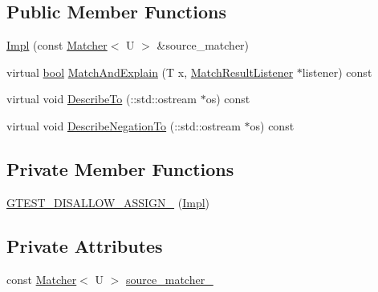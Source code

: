 \subsection*{Public Member Functions}
\begin{DoxyCompactItemize}
\item 
\hyperlink{classtesting_1_1internal_1_1MatcherCastImpl_3_01T_00_01Matcher_3_01U_01_4_01_4_1_1Impl_adcffa298fd17f1827311420b2075aaab}{Impl} (const \hyperlink{classtesting_1_1Matcher}{Matcher}$<$ U $>$ \&source\+\_\+matcher)
\item 
virtual \hyperlink{classbool}{bool} \hyperlink{classtesting_1_1internal_1_1MatcherCastImpl_3_01T_00_01Matcher_3_01U_01_4_01_4_1_1Impl_acc8cbc68475bb2cb7af971ad788142fc}{Match\+And\+Explain} (T x, \hyperlink{classtesting_1_1MatchResultListener}{Match\+Result\+Listener} $\ast$listener) const
\item 
virtual void \hyperlink{classtesting_1_1internal_1_1MatcherCastImpl_3_01T_00_01Matcher_3_01U_01_4_01_4_1_1Impl_a42677b4e3e3d7b9c8610e33c399f9154}{Describe\+To} (\+::std\+::ostream $\ast$os) const
\item 
virtual void \hyperlink{classtesting_1_1internal_1_1MatcherCastImpl_3_01T_00_01Matcher_3_01U_01_4_01_4_1_1Impl_a2d363b3748fd1f4fd98372d1f4bfce4e}{Describe\+Negation\+To} (\+::std\+::ostream $\ast$os) const
\end{DoxyCompactItemize}
\subsection*{Private Member Functions}
\begin{DoxyCompactItemize}
\item 
\hyperlink{classtesting_1_1internal_1_1MatcherCastImpl_3_01T_00_01Matcher_3_01U_01_4_01_4_1_1Impl_a30403b33c628cb4cda127354b18b4896}{G\+T\+E\+S\+T\+\_\+\+D\+I\+S\+A\+L\+L\+O\+W\+\_\+\+A\+S\+S\+I\+G\+N\+\_\+} (\hyperlink{classtesting_1_1internal_1_1MatcherCastImpl_3_01T_00_01Matcher_3_01U_01_4_01_4_1_1Impl_adcffa298fd17f1827311420b2075aaab}{Impl})
\end{DoxyCompactItemize}
\subsection*{Private Attributes}
\begin{DoxyCompactItemize}
\item 
const \hyperlink{classtesting_1_1Matcher}{Matcher}$<$ U $>$ \hyperlink{classtesting_1_1internal_1_1MatcherCastImpl_3_01T_00_01Matcher_3_01U_01_4_01_4_1_1Impl_a812216395addd6e4bcfe54317ae42236}{source\+\_\+matcher\+\_\+}
\end{DoxyCompactItemize}


